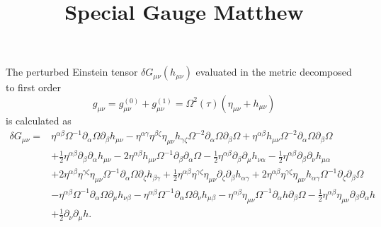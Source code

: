 \documentclass[10pt,letterpaper]{article}
\title{Special Gauge Matthew}
\date{}
\begin{document}
\maketitle
\noindent
The perturbed Einstein tensor $\delta  G_{\mu\nu}( h_{\mu\nu})$ evaluated in the metric decomposed to first order 
\begin{equation}
g_{\mu\nu} = g^{(0)}_{\mu\nu} + g^{(1)}_{\mu\nu} = \Omega^2(\tau)(\eta_{\mu\nu}+h_{\mu\nu})
\end{equation}
is calculated as 
\begin{align}
\delta G_{\mu\nu}={}&\eta^{\alpha \beta} \Omega^{-1} \partial_{\alpha}\Omega \partial_{\beta}h_{\mu \nu}
 -  \eta^{\alpha \gamma} \eta^{\beta \zeta} \eta_{\mu \nu} h_{\gamma \zeta} \Omega^{-2} \partial_{\alpha}\Omega \partial_{\beta}\Omega
 + \eta^{\alpha \beta} h_{\mu \nu} \Omega^{-2} \partial_{\alpha}\Omega \partial_{\beta}\Omega\nonumber\\
& + \tfrac{1}{2} \eta^{\alpha \beta} \partial_{\beta}\partial_{\alpha}h_{\mu \nu}
 - 2 \eta^{\alpha \beta} h_{\mu \nu} \Omega^{-1} \partial_{\beta}\partial_{\alpha}\Omega
 -  \tfrac{1}{2} \eta^{\alpha \beta} \partial_{\beta}\partial_{\mu}h_{\nu \alpha}
 -  \tfrac{1}{2} \eta^{\alpha \beta} \partial_{\beta}\partial_{\nu}h_{\mu \alpha}\nonumber\\
& + 2 \eta^{\alpha \beta} \eta^{\gamma \zeta} \eta_{\mu \nu} \Omega^{-1} \partial_{\alpha}\Omega \partial_{\zeta}h_{\beta \gamma}
 + \tfrac{1}{2} \eta^{\alpha \beta} \eta^{\gamma \zeta} \eta_{\mu \nu} \partial_{\zeta}\partial_{\beta}h_{\alpha \gamma}
 + 2 \eta^{\alpha \beta} \eta^{\gamma \zeta} \eta_{\mu \nu} h_{\alpha \gamma} \Omega^{-1} \partial_{\zeta}\partial_{\beta}\Omega\nonumber\\
& -  \eta^{\alpha \beta} \Omega^{-1} \partial_{\alpha}\Omega \partial_{\mu}h_{\nu \beta}
 -  \eta^{\alpha \beta} \Omega^{-1} \partial_{\alpha}\Omega \partial_{\nu}h_{\mu \beta}- \eta^{\alpha \beta} \eta_{\mu \nu} \Omega^{-1} \partial_{\alpha}h \partial_{\beta}\Omega -  \tfrac{1}{2} \eta^{\alpha \beta} \eta_{\mu \nu} \partial_{\beta}\partial_{\alpha}h\nonumber \\
& + \tfrac{1}{2} \partial_{\nu}\partial_{\mu}h.
\end{align}
\end{document}

